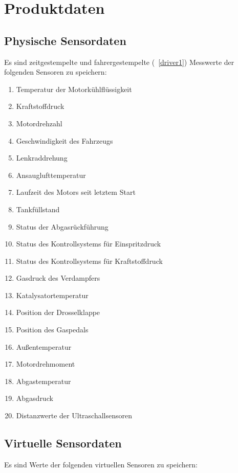 \documentclass[pflichtenheft.tex]{subfiles}
\begin{document}
\chapter{Produktdaten}

\renewcommand{\theenumi}{/PD\ifnum \value{enumi}<10 0\fi\arabic{enumi}0/}
\renewcommand{\labelenumi}{\theenumi}
\renewcommand{\theenumii}{\arabic{enumii}}
\renewcommand{\labelenumii}{PD\ifnum \value{enumi}<10 0\fi\arabic{enumi}\arabic{enumii}/}

\section{Physische Sensordaten}
Es sind zeitgestempelte und fahrergestempelte (~\ref{driver1}) Messwerte der folgenden Sensoren zu speichern:
\begin{enumerate}
\item
Temperatur der Motorkühlflüssigkeit
\item
Kraftstoffdruck
\item
Motordrehzahl
\item
Geschwindigkeit des Fahrzeugs
\item
Lenkraddrehung
\item
Ansauglufttemperatur 
\item
Laufzeit des Motors seit letztem Start
\item
Tankfüllstand
\item
Status der Abgasrückführung
\item
Status des Kontrollsystems für Einspritzdruck
\item
Status des Kontrollsystems für Kraftstoffdruck
\item
Gasdruck des Verdampfers
\item
Katalysatortemperatur
\item
Position der Drosselklappe
\item
Position des Gaspedals
\item
Außentemperatur
\item
Motordrehmoment
\item
Abgastemperatur
\item
Abgasdruck
\item
Distanzwerte der Ultraschallsensoren
\setcounter{enumTemp}{\value{enumi}}
\end{enumerate}

\section{Virtuelle Sensordaten}
Es sind Werte der folgenden virtuellen Sensoren zu speichern:
\end{document}

